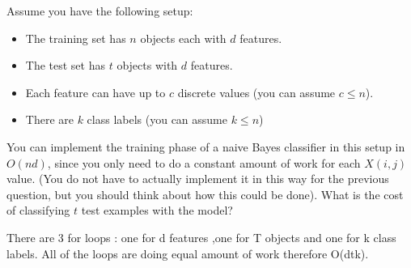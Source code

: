 \documentclass{article}
\def\blu#1{{\color{blu}#1}}
\def\gre#1{{\color{gre}#1}}
\def\items#1{\begin{itemize}#1\end{itemize}}
\begin{document}
Assume you have the following setup:
\items{
\item The training set has $n$ objects each with $d$ features.
\item The test set has $t$ objects with $d$ features.
\item Each feature can have up to $c$ discrete values (you can assume $c \leq n$).
\item There are $k$ class labels (you can assume $k \leq n$)
}
You can implement the training phase of a naive Bayes classifier in this setup in $O(nd)$, since you only need to do a constant amount of work for each $X(i,j)$ value. (You do not have to actually implement it in this way for the previous question, but you should think about how this could be done). \blu{What is the cost of classifying $t$ test examples with the model?}

\gre{There are 3 for loops : one for d features ,one for T objects and one for k class labels.  All of the loops are doing equal amount of work therefore O(dtk).}

\end{document}
